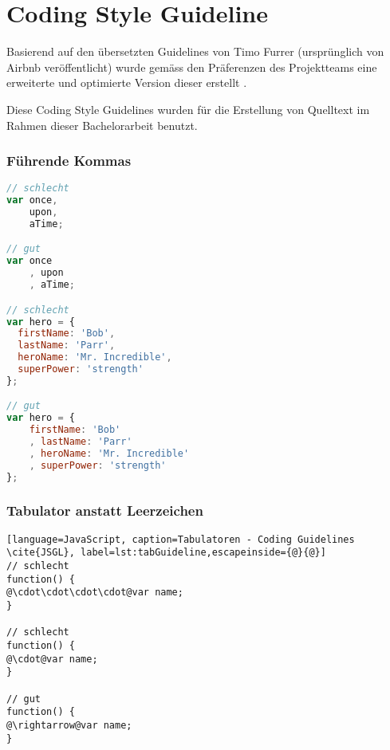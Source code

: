 \chapter{Coding Style Guideline}
\label{sec:coding-guidelines}
Basierend auf den übersetzten Guidelines von Timo Furrer \cite{JSGLDe} (ursprünglich von Airbnb \cite{JSGLOrigin} veröffentlicht) wurde gemäss den Präferenzen des Projektteams eine erweiterte und optimierte Version dieser erstellt \cite{JSGL}.

Diese Coding Style Guidelines wurden für die Erstellung von Quelltext im Rahmen dieser Bachelorarbeit benutzt.

\subsection*{Führende Kommas}
\begin{lstlisting}[language=JavaScript, caption=Führende Kommas - Coding Guidelines \cite{JSGL}, label=lst:leadingCommas]
// schlecht
var once,
    upon,
    aTime;

// gut
var once
    , upon
    , aTime;

// schlecht
var hero = {
  firstName: 'Bob',
  lastName: 'Parr',
  heroName: 'Mr. Incredible',
  superPower: 'strength'
};

// gut
var hero = {
    firstName: 'Bob'
    , lastName: 'Parr'
    , heroName: 'Mr. Incredible'
    , superPower: 'strength'
};
\end{lstlisting}

\subsection*{Tabulator anstatt Leerzeichen}
\begin{lstlisting}[language=JavaScript, caption=Tabulatoren - Coding Guidelines \cite{JSGL}, label=lst:tabGuideline,escapeinside={@}{@}]
// schlecht
function() {
@\cdot\cdot\cdot\cdot@var name;
}

// schlecht
function() {
@\cdot@var name;
}

// gut
function() {
@\rightarrow@var name;
}
\end{lstlisting}
